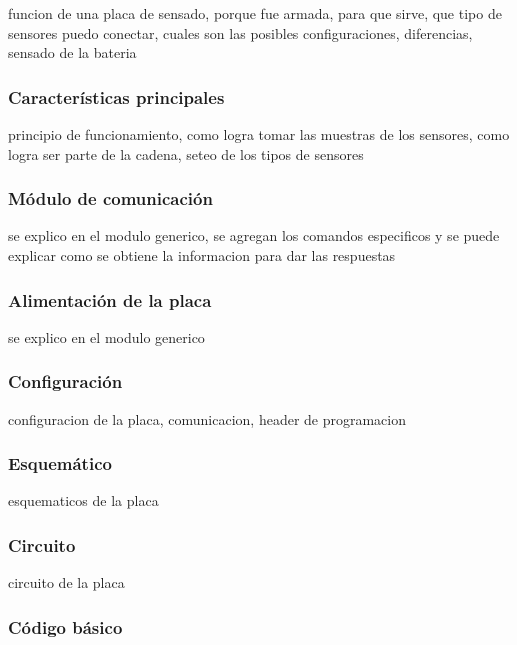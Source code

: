 funcion de una placa de sensado, porque fue armada, para que sirve, que tipo de sensores puedo conectar, cuales son las posibles configuraciones, diferencias, sensado de la bateria

\subsubsection{Caracter\'isticas principales}
\label{h_placas_sensado_caracteristicas}

principio de funcionamiento, como logra tomar las muestras de los sensores, como logra ser parte de la cadena, seteo de los tipos de sensores

\subsubsection{M\'odulo de comunicaci\'on}
\label{h_placas_sensado_comm}

se explico en el modulo generico, se agregan los comandos especificos y se puede explicar como se obtiene la informacion para dar las respuestas

\subsubsection{Alimentaci\'on de la placa}
\label{h_placas_sensado_alimentacion}

se explico en el modulo generico

\subsubsection{Configuraci\'on}
\label{h_placas_sensado_config}

configuracion de la placa, comunicacion, header de programacion

\subsubsection{Esquem\'atico}
\label{h_placas_sensado_esquematico}

esquematicos de la placa

\subsubsection{Circuito}
\label{h_placas_sensado_circuito}

circuito de la placa

\subsubsection{C\'odigo b\'asico}
\label{h_placas_sensado_codigo}


